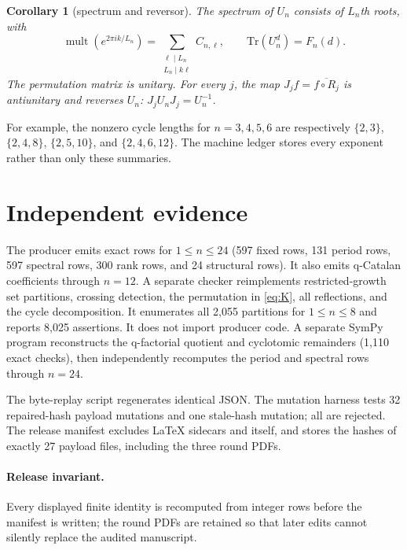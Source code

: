 \documentclass[11pt]{article}
\newtheorem{corollary}[theorem]{Corollary}
\theoremstyle{definition}
\newcommand{\Tr}{\mathrm{Tr}}
\begin{document}
\begin{corollary}[spectrum and reversor]
The spectrum of $U_n$ consists of $L_n$th roots, with
\begin{equation}
 \operatorname{mult}\!\left(e^{2\pi i k/L_n}\right)
 =\sum_{\substack{\ell\mid L_n\\L_n\mid k\ell}}C_{n,\ell},
 \qquad \Tr(U_n^d)=F_n(d).                                  \label{eq:spectrum}
\end{equation}
The permutation matrix is unitary.  For every $j$, the map
$J_jf=\overline{f\circ R_j}$ is antiunitary and reverses $U_n$:
$J_jU_nJ_j=U_n^{-1}$.
\end{corollary}

For example, the nonzero cycle lengths for $n=3,4,5,6$ are respectively
\(\{2,3\}\), \(\{2,4,8\}\), \(\{2,5,10\}\), and
\(\{2,4,6,12\}\).  The machine ledger stores every exponent rather than only
these summaries.

\section{Independent evidence}

The producer emits exact rows for $1\le n\le24$ (597 fixed rows, 131 period
rows, 597 spectral rows, 300 rank rows, and 24 structural rows).  It also emits q-Catalan
coefficients through $n=12$.  A separate checker reimplements restricted-growth
set partitions, crossing detection, the permutation in \eqref{eq:K}, all
reflections, and the cycle decomposition.  It enumerates all 2,055 partitions
for $1\le n\le8$ and reports 8,025 assertions.  It does not import producer
code.  A separate SymPy program reconstructs the q-factorial quotient and
cyclotomic remainders (1,110 exact checks), then independently recomputes the
period and spectral rows through $n=24$.

The byte-replay script regenerates identical JSON.  The mutation harness tests
32 repaired-hash payload mutations and one stale-hash mutation; all are
rejected.  The release manifest excludes LaTeX sidecars and itself, and stores
the hashes of exactly 27 payload files, including the three round PDFs.

\paragraph{Release invariant.}
Every displayed finite identity is recomputed from integer rows before the
manifest is written; the round PDFs are retained so that later edits cannot
silently replace the audited manuscript.
\end{document}
